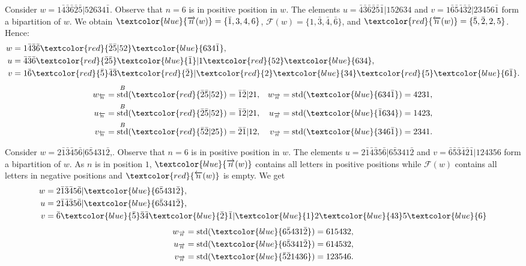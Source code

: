 \documentclass[Unicode]{cedram-alco}
\theoremstyle{definition}
\DeclareMathOperator{\std}{std}
\newcommand{\R}{{\overrightarrow{n}}}
\newcommand{\LL}{{\overleftarrow{n}}}
\newcommand{\Bstd}{\std^{B}}
\newcommand{\F}{\mathcal{F}}
\newcommand{\red}[1]{\textcolor{red}{#1}}
\newcommand{\blue}[1]{\textcolor{blue}{#1}}
\begin{document}
\begin{ex}
\label{ex:typeB-pos2}
Consider $w = 1 \bar{4} \bar{3} \bar{6} \bar{2} \bar{5} | 5 2 6 3 4 \bar{1}$. Observe that $n=6$ is in positive position in $w$. The elements $u = \bar{4} \bar{3} \bar{6} \bar{2} \bar{5} \bar{1} | 1 5 2 6 3 4$ and $v = 1 \bar{6} \bar{5} \bar{4} \bar{3} \bar{2} | 2 3 4 5 6 \bar{1}$ form a bipartition of $w$. We obtain $\blue{\R(w)} = \lbrace \bar{1}, 3, 4, 6 \rbrace$, $\F(w) = \lbrace 1, \bar{3}, \bar{4}, \bar{6} \rbrace$, and $\red{\LL(w)} = \lbrace \bar{5}, \bar{2}, 2, 5 \rbrace$. Hence: 
\begin{align*}
w &= 1 \bar{4} \bar{3} \bar{6}\red{ \bar{2} \bar{5} | 5 2} \blue{ 6 3 4 \bar{1}} ,\\
u &= \bar{4} \bar{3} \bar{6} \red{\bar{2} \bar{5}} \blue{\bar{1}} | 1 \red{5 2} \blue{ 6 3 4} ,\\
v &= 1 \bar{6} \red{\bar{5}} \bar{4} \bar{3} \red{\bar{2}} | \red{2} \blue{3 4} \red{5} \blue{ 6 \bar{1}}.
\end{align*}
\begin{align*}
w_\LL &= \Bstd(\red{\bar{2} \bar{5} | 5 2}) = \bar{1} \bar{2} | 2 1, & w_\R &= \std(\blue{6 3 4 \bar{1}}) = 4 2 3 1, \\
u_\LL &= \Bstd(\red{\bar{2} \bar{5} | 5 2}) = \bar{1} \bar{2} | 2 1, & u_\R &= \std(\blue{\bar{1} 6 3 4}) = 1 4 2 3 ,\\
v_\LL &= \Bstd(\red{\bar{5} \bar{2} | 2 5}) = \bar{2} \bar{1} | 1 2, & v_\R &= \std(\blue{3 4 6 \bar{1}}) = 2 3 4 1. 
\end{align*}
\end{ex}

\begin{ex}
\label{ex:typeB-pos3}
Consider $w = 2 \bar{1} \bar{3} \bar{4} 5 \bar{6} | 6 \bar{5} 4 3 1 \bar{2}$,. Observe that $n=6$ is in positive position in $w$. The elements  $u = 2 \bar{1} \bar{4} \bar{3} 5 \bar{6} | 6 \bar{5} 3 4 1 \bar{2}$ and $v = \bar{6} \bar{5} \bar{3} \bar{4} \bar{2} \bar{1} | 1 2 4 3 5 6$ form a bipartition of $w$.  As $n$ is in position $1$, $\blue{\R(w)}$ contains all letters in positive positions while $\F(w)$ contains all letters in negative positions and $\red{\LL(w)}$ is empty. We get
\begin{align*}
w &= 2 \bar{1} \bar{3} \bar{4} 5 \bar{6} | \blue{6 \bar{5} 4 3 1 \bar{2}}, \\
u &= 2 \bar{1} \bar{4} \bar{3} 5 \bar{6} | \blue{6 \bar{5} 3 4 1 \bar{2}} ,\\
v &= \bar{6} \blue{\bar{5}} \bar{3} \bar{4} \blue{\bar{2}} \bar{1} |  \blue{1} 2 \blue{ 4 3 } 5 \blue{ 6}
\end{align*}
\begin{align*}
w_\R &= \std(\blue{6 \bar{5} 4 3 1 \bar{2}}) = 6 1 5 4 3 2, \\
u_\R &= \std(\blue{6 \bar{5} 3 4 1 \bar{2}}) = 6 1 4 5 3 2 ,\\
v_\R &= \std(\blue{\bar{5} \bar{2} 1 4 3 6}) = 1 2 3 5 4 6. 
\end{align*}
\end{ex}
\end{document}
